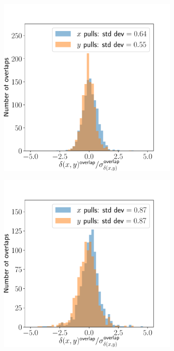 \documentclass{article}
\begin{document}
\begin{figure}[ht]
	\centering
	\begin{subfigure}{0.24\linewidth}
		\includegraphics[width=\linewidth]{stitch-pull-4-1.pdf}
		\caption{}
		\label{fig:stitchpull41}
	\end{subfigure}
	\begin{subfigure}{0.24\linewidth}
		\includegraphics[width=\linewidth]{stitch-pull-3-1.pdf}

\end{subfigure}
\end{figure}
\end{document}
